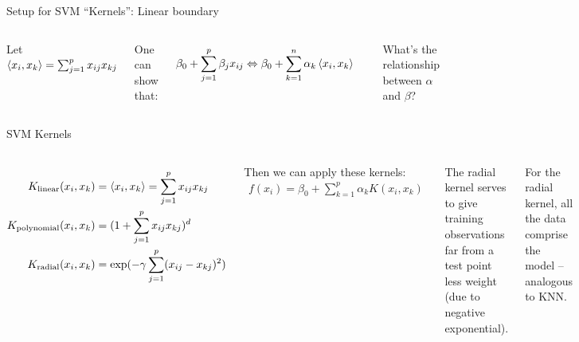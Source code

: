 \documentclass[mathserif, aspectratio=169]{beamer}
\begin{document}
\begin{frame}{Setup for SVM ``Kernels'': Linear boundary}



\begin{columns}
\vspace{10mm}

Let $\braket{x_i,x_k} = \sum_{j=1}^px_{ij}x_{kj}$

\vspace{5mm}

One can show that:

\begin{align*}
\beta_0 + \sum_{j=1}^p \beta_j x_{ij} &\Leftrightarrow \beta_0 + \sum_{k=1}^n \alpha_k \braket{x_i,x_k}
\end{align*}

\vspace{50mm}
\pause What's the relationship between $\alpha$ and $\beta$?
\end{columns}
\end{frame}


\begin{frame}{SVM Kernels}
\begin{columns}

\begin{align*}
K_\text{linear}(x_i,x_k) &= \braket{x_i,x_k} = \sum_{j=1}^px_{ij}x_{kj}\\
K_\text{polynomial}(x_i,x_k) &= (1+ \sum_{j=1}^px_{ij}x_{kj})^d\\
K_\text{radial}(x_i,x_k) &= \exp(-\gamma \sum_{j=1}^p(x_{ij}-x_{kj})^2)\\
\end{align*}

Then we can apply these kernels:
\begin{align*}
f(x_i) = \beta_0+\sum_{k=1}^p \alpha_k K(x_i,x_k) 
\end{align*}

The radial kernel serves to give training observations far from a test point less weight (due to negative exponential). 

\vspace{5mm}

For the radial kernel, all the data comprise the model -- analogous to KNN.  
\end{columns}

\end{frame}
\end{document}
